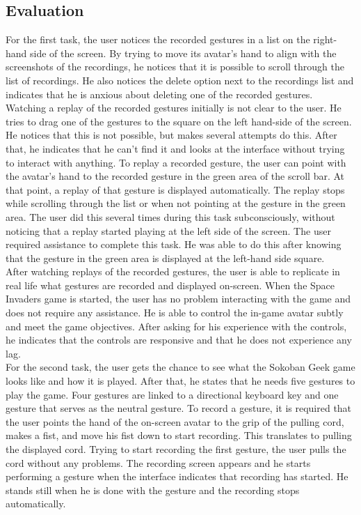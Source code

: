 \subsection{Evaluation}

For the first task, the user notices the recorded gestures in a list on the right-hand side of the screen. By trying to move its avatar's hand to align with the screenshots of the recordings, he notices that it is possible to scroll through the list of recordings. He also notices the delete option next to the recordings list and indicates that he is anxious about deleting one of the recorded gestures.\\

Watching a replay of the recorded gestures initially is not clear to the user. He tries to drag one of the gestures to the square on the left hand-side of the screen. He notices that this is not possible, but makes several attempts do this. After that, he indicates that he can't find it and looks at the interface without trying to interact with anything. To replay a recorded gesture, the user can point with the avatar's hand to the recorded gesture in the green area of the scroll bar. At that point, a replay of that gesture is displayed automatically. The replay stops while scrolling through the list or when not pointing at the gesture in the green area. The user did this several times during this task subconsciously, without noticing that a replay started playing at the left side of the screen. The user required assistance to complete this task. He was able to do this after knowing that the gesture in the green area is displayed at the left-hand side square.\\

After watching replays of the recorded gestures, the user is able to replicate in real life what gestures are recorded and displayed on-screen. When the Space Invaders game is started, the user has no problem interacting with the game and does not require any assistance. He is able to control the in-game avatar subtly and meet the game objectives. After asking for his experience with the controls, he indicates that the controls are responsive and that he does not experience any lag.\\

For the second task, the user gets the chance to see what the Sokoban Geek game looks like and how it is played. After that, he states that he needs five gestures to play the game. Four gestures are linked to a directional keyboard key and one gesture that serves as the neutral gesture. To record a gesture, it is required that the user points the hand of the on-screen avatar to the grip of the pulling cord, makes a fist, and move his fist down to start recording. This translates to pulling the displayed cord. Trying to start recording the first gesture, the user pulls the cord without any problems. The recording screen appears and he starts performing a gesture when the interface indicates that recording has started. He stands still when he is done with the gesture and the recording stops automatically.\\

